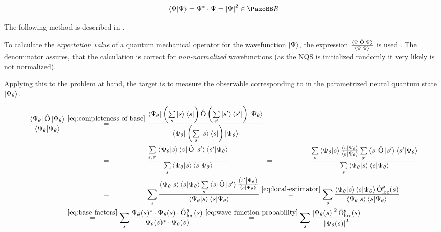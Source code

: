 \begin{equation}
    \label{eq:wave-function-probability}
    \bra{\Psi}\ket{\Psi} = \Psi^\ast\cdot \Psi = \left|\Psi\right|^2 \in \mathbb{R}
\end{equation}

The following method is described in \cite{jVMCPaper}.

To calculate the \emph{expectation value} of a quantum mechanical operator \operator for the wavefunction $\ket{\Psi}$, the expression 
$\frac{\bra{\Psi}\hat{\mathrm{O}}\ket{\Psi}}{\bra{\Psi}\ket{\Psi}}$ is used \cite{schwablQM}. The denominator assures, that the calculation is correct for \emph{non-normalized} wavefunctions (as the NQS is initialized randomly it very likely is not normalized). 

Applying this to the problem at hand, the target is to measure the observable corresponding to \operator in the parametrized neural quantum state $\ket{\Psi_\theta}$.

\begin{equation}
    \label{eq:derivation-local-estimator}
    \begin{split}
        \frac{\bra{\Psi_\theta}\operator\ket{\Psi_\theta}}{\bra{\Psi_\theta}\ket{\Psi_\theta}} &\stackrel{\ref{eq:completeness-of-base}}{=}
        \frac{\bra{\Psi_\theta} \left(\sum\limits_{s} \ket{s}\bra{s}\right)
        \operator \left(\sum\limits_{s'} \ket{s'}\bra{s'}\right) \ket{\Psi_\theta}}{\bra{\Psi_\theta}\left(\sum\limits_{s} \ket{s}\bra{s}\right)\ket{\Psi_\theta}}\\
        &\stackrel{\phantom{\ref{eq:completeness-of-base}}}{=}
        \frac{\sum\limits_{s, s'} \bra{\Psi_\theta} \ket{s}\bra{s}
        \operator \ket{s'}\bra{s'} \ket{\Psi_\theta}}{\sum\limits_{s}\bra{\Psi_\theta}\ket{s}\bra{s}\ket{\Psi_\theta}}
        \stackrel{\phantom{\ref{eq:completeness-of-base}}}{=}
        \frac{\sum\limits_{s} \bra{\Psi_\theta} \ket{s} \frac{\bra{s} \ket{\Psi_\theta}}{\bra{s} \ket{\Psi_\theta}} \sum\limits_{s'} \bra{s}
        \operator \ket{s'}\bra{s'} \ket{\Psi_\theta}}{\sum\limits_{s}\bra{\Psi_\theta}\ket{s}\bra{s}\ket{\Psi_\theta}}\\
        &\stackrel{\phantom{\ref{eq:completeness-of-base}}}{=}
        \sum\limits_{s} \frac{ \bra{\Psi_\theta} \ket{s}\bra{s} \ket{\Psi_\theta} \sum\limits_{s'} \bra{s}
        \operator \ket{s'} \frac{\bra{s'} \ket{\Psi_\theta}}{\bra{s} \ket{\Psi_\theta}}}{\bra{\Psi_\theta}\ket{s}\bra{s}\ket{\Psi_\theta}}
        \stackrel{\ref{eq:local-estimator}}{=}
        \sum\limits_{s} \frac{ \bra{\Psi_\theta} \ket{s}\bra{s} \ket{\Psi_\theta} \operator_\mathrm{loc}^\theta(s)}{\bra{\Psi_\theta}\ket{s}\bra{s}\ket{\Psi_\theta}}\\
        &\stackrel{\ref{eq:base-factors}}{=}
        \sum\limits_{s} \frac{ \Psi_\theta(s)^\ast \cdot \Psi_\theta(s) \cdot \operator_\mathrm{loc}^\theta(s)}{\Psi_\theta(s)^\ast \cdot \Psi_\theta(s)}
        \stackrel{\ref{eq:wave-function-probability}}{=}
        \sum\limits_{s} \frac{ \left|\Psi_\theta(s)\right|^2  \operator_\mathrm{loc}^\theta(s)}{\left|\Psi_\theta(s)\right|^2}
    \end{split}
\end{equation}

